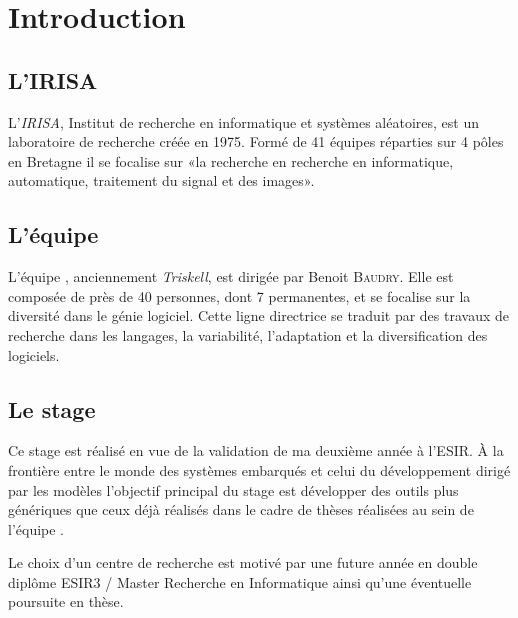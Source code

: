 \section*{Introduction} %
{}

\subsection{L'IRISA}

L'\emph{IRISA}\cite{irisa}, Institut de recherche en informatique et systèmes aléatoires, est un laboratoire de recherche créée en 1975. Formé de 41 équipes réparties sur 4 pôles en Bretagne il se focalise sur «la recherche en recherche en informatique, automatique, traitement du signal et des images».

\subsection{L'équipe \diver}

L'équipe \diver\cite{diverse}, anciennement \emph{Triskell}, est dirigée par Benoit \textsc{Baudry}. Elle est composée de près de 40 personnes, dont 7 permanentes, et se focalise sur la diversité dans le génie logiciel. Cette ligne directrice se traduit par des travaux de recherche dans les langages, la variabilité, l'adaptation et la diversification des logiciels.

\subsection{Le stage}
Ce stage est réalisé en vue de la validation de ma deuxième année à l'ESIR. À la frontière entre le monde des systèmes embarqués et celui du développement dirigé par les modèles l'objectif principal du stage est développer des outils plus génériques que ceux déjà réalisés dans le cadre de thèses réalisées au sein de l'équipe \diver.

Le choix d'un centre de recherche est motivé par une future année en double diplôme ESIR3 / Master Recherche en Informatique ainsi qu'une éventuelle poursuite en thèse.